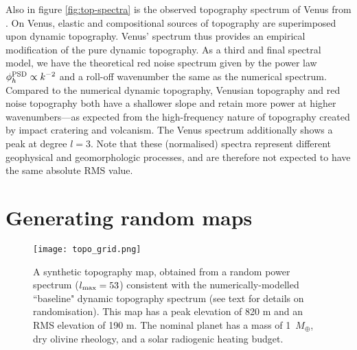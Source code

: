 Also in figure \ref{fig:top-spectra} is the observed topography spectrum of Venus from \citet{wieczorek_gravity_2015}. On Venus, elastic and compositional sources of topography are superimposed upon dynamic topography. Venus' spectrum thus provides an empirical modification of the pure dynamic topography. As a third and final spectral model, we have the theoretical red noise spectrum given by the power law $\phi^{\rm PSD}_h \propto k^{-2}$ and a roll-off wavenumber the same as the numerical spectrum. Compared to the numerical dynamic topography, Venusian topography and red noise topography both have a shallower slope and retain more power at higher wavenumbers---as expected from the high-frequency nature of topography created by impact cratering and volcanism. The Venus spectrum additionally shows a peak at degree $l=3$. Note that these (normalised) spectra represent different geophysical and geomorphologic processes, and are therefore not expected to have the same absolute RMS value.


\section*{Generating random maps} \label{sec:spectral-repeat-top}


\begin{figure}
    \centering
    \texttt{[image: topo\_grid.png]}
    \caption[An example of a synthetic topography map of an exoplanet, obtained by expanding a realistic power spectrum.]{A synthetic topography map, obtained from a random power spectrum ($l_{\rm max} = 53$) consistent with the numerically-modelled ``baseline" dynamic topography spectrum (see text for details on randomisation). This map has a peak elevation of 820 m and an RMS elevation of 190 m. The nominal planet has a mass of 1~$M_\oplus$, dry olivine rheology, and a solar radiogenic heating budget.
    \label{fig:synth-map}}
\end{figure}

